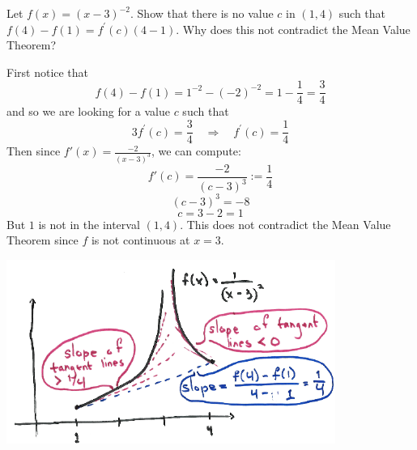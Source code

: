 \documentclass[nooutcomes,handout]{ximera}
\begin{document}
\begin{problem}
  Let $f(x) = (x-3)^{-2}$.
  Show that there is no value $c$ in $(1,4)$ such that $f(4) - f(1) = f^{\prime}(c) (4-1)$.
  Why does this not contradict the Mean Value Theorem?
  \begin{freeResponse}
    First notice that 
    $$f(4)-f(1) = 1^{-2} - (-2)^{-2} = 1-\frac{1}{4} = \frac{3}{4}$$
    and so we are looking for a value $c$ such that 
    $$3 f^\prime (c) = \frac{3}{4} \quad \Longrightarrow \quad f^\prime (c) = \frac{1}{4} $$
    Then since $f'(x) = \frac{-2}{(x-3)^3}$, we can compute:
    $$ f'(c) = \frac{-2}{(c-3)^3} := \frac{1}{4}$$
    $$ (c-3)^3 = - 8 $$
    $$ c = 3 - 2 = 1 $$
    But $1$ is not in the interval $(1,4)$.  This does not contradict the Mean Value Theorem since $f$ is not continuous at $x=3$.

    \begin{image}
      \includegraphics[scale=.65]{Images/Figure5.png}
    \end{image}
  \end{freeResponse}
\end{problem}
\end{document}
